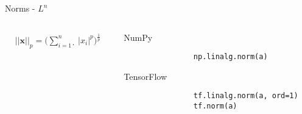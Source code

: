 \documentclass[handout]{beamer}
\begin{document}
\begin{frame}[fragile]{Norms - $L^n$}
    \begin{columns}
        \begin{column}{0.5\textwidth}
        \huge
            \begin{align*}
                ||\boldsymbol{x}||_p = \Bigg( \sum^{n}_{i=1}̣ |x_i|^p\Bigg)^\frac{1}{p}
            \end{align*}
        \end{column}
        \begin{column}{0.5\textwidth}
            \begin{alertblock}{NumPy}
                \begin{lstlisting}
                np.linalg.norm(a)
                \end{lstlisting}
            \end{alertblock}
            \begin{alertblock}{TensorFlow}
                \begin{lstlisting}
                tf.linalg.norm(a, ord=1)
                tf.norm(a)
                \end{lstlisting}
            \end{alertblock}
        \end{column}
    \end{columns}
\end{frame}
\end{document}
